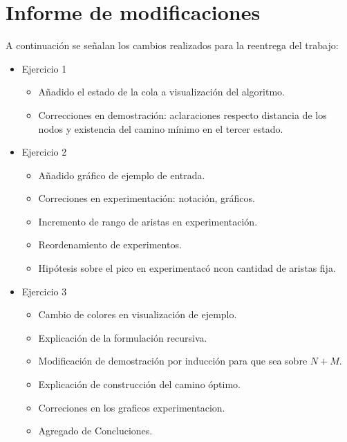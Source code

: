 \section*{Informe de modificaciones}

A continuación se señalan los cambios realizados para la reentrega del trabajo:

\begin{itemize}
	\item{
		Ejercicio 1
		\begin{itemize}
			\item{Añadido el estado de la cola a visualización del algoritmo.}
			\item{Correcciones en demostración: aclaraciones respecto distancia
				de los nodos y existencia del camino mínimo en el tercer estado.}
		\end{itemize}
	}
	\item{
		Ejercicio 2
		\begin{itemize}
			\item{Añadido gráfico de ejemplo de entrada.}
			\item{Correciones en experimentación: notación, gráficos.}
			\item{Incremento de rango de aristas en experimentación.}
			\item{Reordenamiento de experimentos.}
			\item{Hipótesis sobre el pico en experimentacó ncon cantidad de aristas fija.}
		\end{itemize}
	}
	\item{
		Ejercicio 3
		\begin{itemize}
			\item{Cambio de colores en visualización de ejemplo.}
			\item{Explicación de la formulación recursiva.}
			\item{Modificación de demostración por inducción para que sea sobre
				$N + M$.}
			\item{Explicación de construcción del camino óptimo.}
			\item{Correciones en los graficos experimentacion.}
			\item{Agregado de Concluciones.}
		\end{itemize}
	}
\end{itemize}
